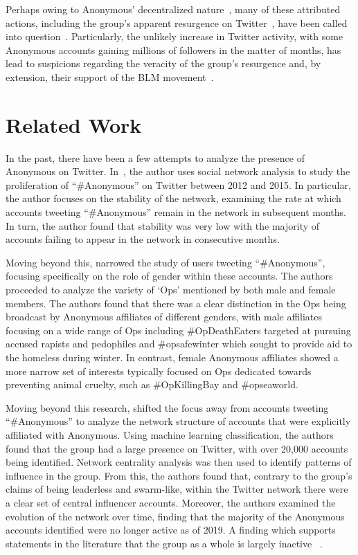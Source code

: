 \documentclass[letterpaper]{article}
\begin{document}
Perhaps owing to Anonymous' decentralized nature~\cite{Uitermark2017}, many of these attributed actions, including the group's apparent resurgence on Twitter~\cite{Independant2020}, have been called into question~\cite{Telegraph2020}. Particularly, the unlikely increase in Twitter activity, with some Anonymous accounts gaining millions of followers in the matter of months, has lead to suspicions regarding the veracity of the group's resurgence and, by extension, their support of the BLM movement~\cite{Telegraph2020}.

\section{Related Work}

In the past, there have been a few attempts to analyze the presence of Anonymous on Twitter. In~\cite{Beraldo2017}, the author uses social network analysis to study the proliferation of ``\#Anonymous'' on Twitter between 2012 and 2015. In particular, the author focuses on the stability of the network, examining the rate at which accounts tweeting  ``\#Anonymous'' remain in the network in subsequent months. In turn, the author found that stability was very low with the majority of accounts failing to appear in the network in consecutive months.

Moving beyond this, \citet{McGovern2020} narrowed the study of users tweeting ``\#Anonymous'', focusing specifically on the role of gender within these accounts. The authors proceeded to analyze the variety of `Ops' mentioned by both male and female members. The authors found that there was a clear distinction in the Ops being broadcast by Anonymous affiliates of different genders, with male affiliates focusing on a wide range of Ops including \#OpDeathEaters targeted at pursuing accused rapists and pedophiles and \#opsafewinter which sought to provide aid to the homeless during winter. In contrast, female Anonymous affiliates showed a more narrow set of interests typically focused on Ops dedicated towards preventing animal cruelty, such as \#OpKillingBay and \#opseaworld.

Moving beyond this research, \citet{Jones2020} shifted the focus away from accounts tweeting ``\#Anonymous'' to analyze the network structure of accounts that were explicitly affiliated with Anonymous. Using machine learning classification, the authors found that the group had a large presence on Twitter, with over 20,000 accounts being identified. Network centrality analysis was then used to identify patterns of influence in the group. From this, the authors found that, contrary to the group's claims of being leaderless and swarm-like, within the Twitter network there were a clear set of central influencer accounts. Moreover, the authors examined the evolution of the network over time, finding that the majority of the Anonymous accounts identified were no longer active as of 2019. A finding which supports statements in the literature that the group as a whole is largely inactive~\cite{Uitermark2017} .
\end{document}
